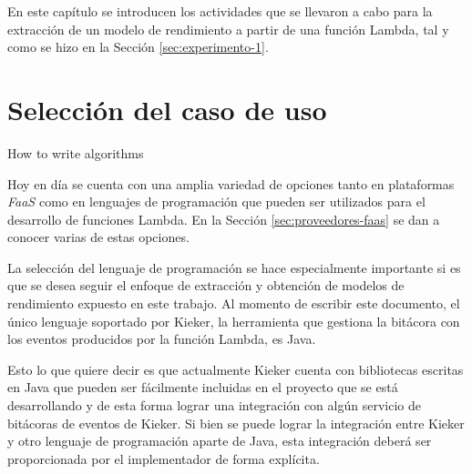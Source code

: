 En este capítulo se introducen los actividades que se llevaron a cabo para la extracción de un modelo de rendimiento a partir de una función Lambda, tal y como se hizo en la Sección \ref{sec:experimento-1}. 

\section{Selección del caso de uso}

\begin{singlespace}
\begin{algorithm}[H]
\SetAlgoLined
 \caption{How to write algorithms}
\end{algorithm}
\end{singlespace}

Hoy en día se cuenta con una amplia variedad de opciones tanto en plataformas \emph{FaaS} como en lenguajes de programación que pueden ser utilizados para el desarrollo de funciones Lambda. En la Sección \ref{sec:proveedores-faas} se dan a conocer varias de estas opciones.

La selección del lenguaje de programación se hace especialmente importante si es que se desea seguir el enfoque de extracción y obtención de modelos de rendimiento expuesto en este trabajo. Al momento de escribir este documento, el único lenguaje soportado por Kieker, la herramienta que gestiona la bitácora con los eventos producidos por la función Lambda, es Java.

Esto lo que quiere decir es que actualmente Kieker cuenta con bibliotecas escritas en Java que pueden ser fácilmente incluidas en el proyecto que se está desarrollando y de esta forma lograr una integración con algún servicio de bitácoras de eventos de Kieker. Si bien se puede lograr la integración entre Kieker y otro lenguaje de programación aparte de Java, esta integración deberá ser proporcionada por el implementador de forma explícita. 


